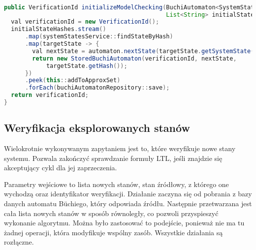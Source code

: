 \begin{minipage}{\linewidth}
\begin{lstlisting}[caption={Kod obsługujący inicjację weryfikacji modelowej.},captionpos=b,label={lst:initializeModelChecking},language=Java]

public VerificationId initializeModelChecking(BuchiAutomaton<SystemState> automaton,
                                              List<String> initialStateHashes) {
  val verificationId = new VerificationId();
  initialStateHashes.stream()
      .map(systemStatesService::findStateByHash)
      .map(targetState -> {
        val nextState = automaton.nextState(targetState.getSystemState());
        return new StoredBuchiAutomaton(verificationId, nextState,
            targetState.getHash());
      })
      .peek(this::addToApproxSet)
      .forEach(buchiAutomatonRepository::save);
  return verificationId;
}

\end{lstlisting}
\end{minipage}


\subsection{Weryfikacja eksplorowanych stanów}

Wielokrotnie wykonywanym zapytaniem jest to, które weryfikuje nowe stany systemu.
Pozwala zakończyć sprawdzanie formuły LTL, jeśli znajdzie się akceptujący cykl dla jej zaprzeczenia.

Parametry wejściowe to lista nowych stanów, stan źródłowy, z którego one wychodzą oraz identyfikator weryfikacji.
Działanie zaczyna się od pobrania z bazy danych automatu Büchiego, który odpowiada źródłu.
Następnie przetwarzana jest cała lista nowych stanów w sposób równoległy, co pozwoli przyspieszyć wykonanie algorytmu.
Można było zastosować to podejście, ponieważ nie ma tu żadnej operacji, która modyfikuje wspólny zasób.
Wszystkie działania są rozłączne.

